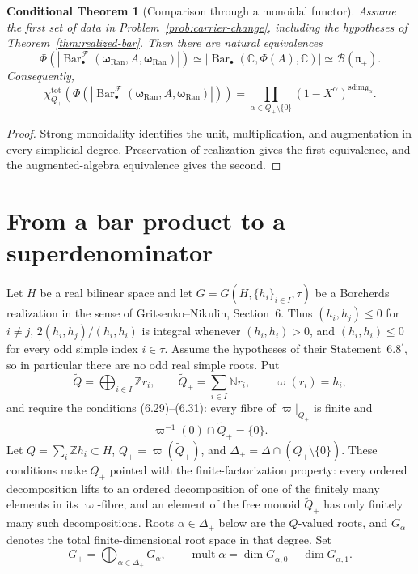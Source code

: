 \documentclass[11pt,reqno]{amsart}
\newtheorem{conditionaltheorem}[theorem]{Conditional Theorem}
\theoremstyle{definition}
\theoremstyle{remark}
\providecommand{\Ran}{\mathrm{Ran}}
\providecommand{\sdim}{\mathrm{sdim}}
\newcommand{\Barc}{\operatorname{Bar}}
\begin{document}
\begin{conditionaltheorem}[Comparison through a monoidal functor]
\label{thm:conditional-comparison}
Assume the first set of data in
Problem~\ref{prob:carrier-change}, including the hypotheses of
Theorem~\ref{thm:realized-bar}.  Then there are natural equivalences
\[
 \Phi\!\left(
   \left|\Barc^{\mathcal F}_\bullet
    (\boldsymbol\omega_{\Ran},A,\boldsymbol\omega_{\Ran})\right|
 \right)
 \simeq
 \left|\Barc_\bullet(\mathbb C,\Phi(A),\mathbb C)\right|
 \simeq
 \mathcal B(\mathfrak n_+).
\]
Consequently,
\[
 \chi_{Q_+}^{\mathrm{tot}}\!\left(
 \Phi\!\left(
   \left|\Barc^{\mathcal F}_\bullet
    (\boldsymbol\omega_{\Ran},A,\boldsymbol\omega_{\Ran})\right|
 \right)\right)
 =
 \prod_{\alpha\in Q_+\setminus\{0\}}
 (1-X^\alpha)^{\sdim\mathfrak g_\alpha}.
\]
\end{conditionaltheorem}

\begin{proof}
Strong monoidality identifies the unit, multiplication, and augmentation
in every simplicial degree.  Preservation of realization gives the
first equivalence, and the augmented-algebra equivalence gives the
second.
\end{proof}

\section{From a bar product to a superdenominator}

Let \(H\) be a real bilinear space and let
\(G=G(H,\{h_i\}_{i\in I},\tau)\) be a Borcherds realization in the
sense of Gritsenko--Nikulin, Section~6.  Thus
\((h_i,h_j)\le0\) for \(i\ne j\),
\(2(h_i,h_j)/(h_i,h_i)\) is integral whenever \((h_i,h_i)>0\), and
\((h_i,h_i)\le0\) for every odd simple index \(i\in\tau\).  Assume the
hypotheses of their Statement~6.8\(^{\prime}\), so in particular there
are no odd real simple roots.  Put
\[
 \widetilde Q=\bigoplus_{i\in I}\mathbb Zr_i,\qquad
 \widetilde Q_+=\sum_{i\in I}\mathbb N r_i,\qquad
 \varpi(r_i)=h_i,
\]
and require the conditions (6.29)--(6.31): every fibre of
\(\varpi|_{\widetilde Q_+}\) is finite and
\[
 \varpi^{-1}(0)\cap\widetilde Q_+=\{0\}.
\]
Let \(Q=\sum_i\mathbb Zh_i\subset H\),
\(Q_+=\varpi(\widetilde Q_+)\), and
\(\Delta_+=\Delta\cap(Q_+\setminus\{0\})\).  These conditions make
\(Q_+\) pointed with the finite-factorization property: every ordered
decomposition lifts to an ordered decomposition of one of the finitely
many elements in its \(\varpi\)-fibre, and an element of the free monoid
\(\widetilde Q_+\) has only finitely many such decompositions.  Roots
\(\alpha\in\Delta_+\) below are the \(Q\)-valued roots, and
\(G_\alpha\) denotes the total finite-dimensional root space in that
degree.  Set
\[
 G_+=\bigoplus_{\alpha\in\Delta_+}G_\alpha,\qquad
 \operatorname{mult}\alpha
 =\dim G_{\alpha,\bar0}-\dim G_{\alpha,\bar1}.
\]
\end{document}
